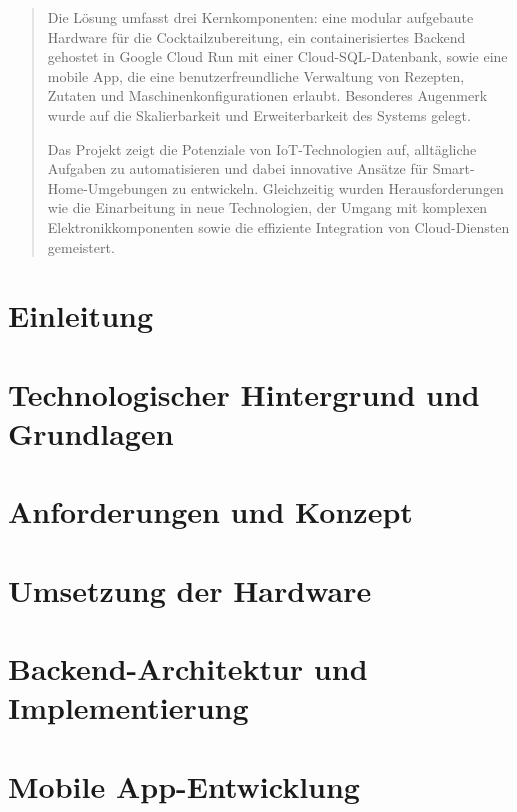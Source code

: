 \documentclass[a4paper, 10pt]{article} %
\begin{document}
\begin{titlepage}
\begin{abstract}
		Die Lösung umfasst drei Kernkomponenten: eine modular aufgebaute
		Hardware für die Cocktailzubereitung, ein containerisiertes Backend gehostet in Google Cloud Run mit einer Cloud-SQL-Datenbank, sowie eine mobile App, die eine benutzerfreundliche Verwaltung von Rezepten, Zutaten
		und Maschinenkonfigurationen erlaubt. Besonderes Augenmerk wurde auf
		die Skalierbarkeit und Erweiterbarkeit des Systems gelegt.
	
		Das Projekt zeigt die Potenziale von IoT-Technologien auf, alltägliche Aufgaben zu automatisieren und dabei innovative Ansätze für Smart-Home-Umgebungen zu entwickeln. Gleichzeitig wurden Herausforderungen wie
		die Einarbeitung in neue Technologien, der Umgang mit komplexen Elektronikkomponenten sowie die effiziente Integration von Cloud-Diensten gemeistert.
	\end{abstract}
  
	\vfill
  \end{titlepage}

\newpage

\section{Einleitung}
    

\section{Technologischer Hintergrund und Grundlagen}
    

\section{Anforderungen und Konzept}
    

\section{Umsetzung der Hardware}
    

\section{Backend-Architektur und Implementierung}
    

\section{Mobile App-Entwicklung}
    
\end{document}
